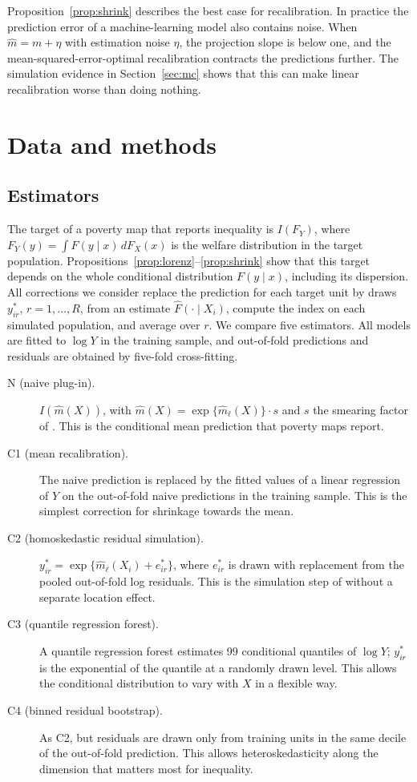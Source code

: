 \documentclass[pdflatex,sn-mathphys-ay]{sn-jnl}
\theoremstyle{thmstyleone}%
\theoremstyle{thmstyletwo}%
\theoremstyle{thmstylethree}%
\begin{document}
Proposition~\ref{prop:shrink} describes the best case for recalibration. In practice the prediction error of a machine-learning model also contains noise. When $\hat m=m+\eta$ with estimation noise $\eta$, the projection slope is below one, and the mean-squared-error-optimal recalibration contracts the predictions further. The simulation evidence in Section~\ref{sec:mc} shows that this can make linear recalibration worse than doing nothing.

\section{Data and methods}\label{sec:design}

\subsection{Estimators}\label{sec:estimators}

The target of a poverty map that reports inequality is $I(F_Y)$, where $F_Y(y)=\int F(y\mid x)\,dF_X(x)$ is the welfare distribution in the target population. Propositions~\ref{prop:lorenz}--\ref{prop:shrink} show that this target depends on the whole conditional distribution $F(y\mid x)$, including its dispersion. All corrections we consider replace the prediction for each target unit by draws $y^*_{ir}$, $r=1,\dots,R$, from an estimate $\hat F(\cdot\mid X_i)$, compute the index on each simulated population, and average over $r$. We compare five estimators. All models are fitted to $\log Y$ in the training sample, and out-of-fold predictions and residuals are obtained by five-fold cross-fitting.

\begin{description}
\item[N (naive plug-in).] $I(\hat m(X))$, with $\hat m(X)=\exp\{\hat m_\ell(X)\}\cdot s$ and $s$ the smearing factor of \citet{duan1983}. This is the conditional mean prediction that poverty maps report.
\item[C1 (mean recalibration).] The naive prediction is replaced by the fitted values of a linear regression of $Y$ on the out-of-fold naive predictions in the training sample. This is the simplest correction for shrinkage towards the mean.
\item[C2 (homoskedastic residual simulation).] $y^*_{ir}=\exp\{\hat m_\ell(X_i)+e^*_{ir}\}$, where $e^*_{ir}$ is drawn with replacement from the pooled out-of-fold log residuals. This is the simulation step of \citet{ell2003} without a separate location effect.
\item[C3 (quantile regression forest).] A quantile regression forest \citep{meinshausen2006} estimates 99 conditional quantiles of $\log Y$; $y^*_{ir}$ is the exponential of the quantile at a randomly drawn level. This allows the conditional distribution to vary with $X$ in a flexible way.
\item[C4 (binned residual bootstrap).] As C2, but residuals are drawn only from training units in the same decile of the out-of-fold prediction. This allows heteroskedasticity along the dimension that matters most for inequality.
\end{description}
\end{document}
